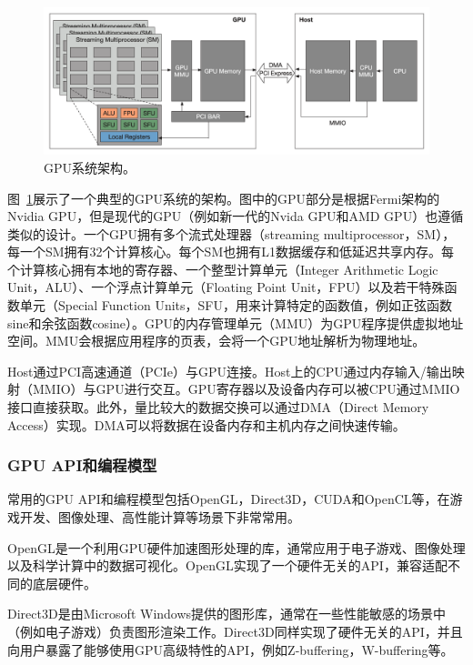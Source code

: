 \begin{figure}[h]
    \centerline{\includegraphics[width=\textwidth]{figures/gpu-arch.png}}
    \caption{GPU系统架构。}
    \label{gpu_arch}
\end{figure}

图~\ref{gpu_arch}展示了一个典型的GPU系统的架构。图中的GPU部分是根据Fermi架构的Nvidia GPU，但是现代的GPU（例如新一代的Nvida GPU和AMD GPU）也遵循类似的设计。一个GPU拥有多个流式处理器（streaming multiprocessor，SM），每一个SM拥有32个计算核心。每个SM也拥有L1数据缓存和低延迟共享内存。每个计算核心拥有本地的寄存器、一个整型计算单元（Integer Arithmetic Logic Unit，ALU）、一个浮点计算单元（Floating Point Unit，FPU）以及若干特殊函数单元（Special Function Units，SFU，用来计算特定的函数值，例如正弦函数sine和余弦函数cosine）。GPU的内存管理单元（MMU）为GPU程序提供虚拟地址空间。MMU会根据应用程序的页表，会将一个GPU地址解析为物理地址。

Host通过PCI高速通道（PCIe）与GPU连接。Host上的CPU通过内存输入/输出映射（MMIO）与GPU进行交互。GPU寄存器以及设备内存可以被CPU通过MMIO接口直接获取。此外，量比较大的数据交换可以通过DMA（Direct Memory Access）实现。DMA可以将数据在设备内存和主机内存之间快速传输。

\subsubsection{GPU API和编程模型}
常用的GPU API和编程模型包括OpenGL\parencite{buck2004brook}，Direct3D\parencite{blythe2006the}，CUDA\parencite{nickolls2008scalable}和OpenCL\parencite{stone2010opencl}等，在游戏开发、图像处理、高性能计算等场景下非常常用。

OpenGL是一个利用GPU硬件加速图形处理的库，通常应用于电子游戏、图像处理以及科学计算中的数据可视化。OpenGL实现了一个硬件无关的API，兼容适配不同的底层硬件。

Direct3D是由Microsoft Windows提供的图形库，通常在一些性能敏感的场景中（例如电子游戏）负责图形渲染工作。Direct3D同样实现了硬件无关的API，并且向用户暴露了能够使用GPU高级特性的API，例如Z-buffering，W-buffering等。

